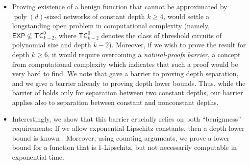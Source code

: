 \documentclass[11pt]{article}
\DeclareMathOperator{\poly}{poly}
\newcommand{\TC}{\textsf{TC}}
\newcommand{\EXP}{\textsf{EXP}}
\begin{document}
\begin{itemize}
	\item  Proving existence of a benign function that cannot be approximated by $\poly(d)$-sized networks of constant depth $k \geq 4$, would settle a longstanding open problem in computational complexity (namely, $\EXP \not \subseteq \TC^0_{k-2}$, where $\TC^0_{k-2}$ denotes the class of threshold circuits of polynomial size and depth $k-2$).  Moreover, if we wish to prove the result for depth $k \geq 6$, it would require overcoming a \emph{natural-proofs barrier}, a concept from computational complexity which indicates that such a proof would be very hard to find.
	We note that \cite{vardi2020neural} gave a barrier to proving depth separation, and we give a barrier already to proving depth lower bounds. Thus, while the barrier of \cite{vardi2020neural} holds only for separation between two constant depths, our barrier applies also to separation between constant and nonconstant depths. 
	
	\item Interestingly, we show that this barrier crucially relies on both ``benignness'' requirements: If we allow exponential Lipschitz constants, then a depth lower bound is known \citep{telgarsky2016benefits}. Moreover, using counting arguments, we prove a lower bound for a function that is $1$-Lipschitz, but not necessarily computable in exponential time. 
\end{itemize}
\end{document}

